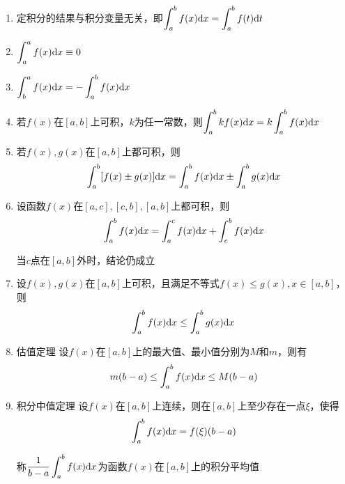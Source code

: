 \begin{property} \label{property:definite_integral}
    \begin{enumerate}
        \item 定积分的结果与积分变量无关，即$\displaystyle\int_a^b f(x)\mathrm{d} x=\int_a^b f(t)\mathrm{d} t$
        \item $\displaystyle\int_a^a f(x)\mathrm{d} x\equiv0$
        \item $\displaystyle\int_b^a f(x)\mathrm{d} x=-\int_a^b f(x)\mathrm{d} x$
        \item 若$f(x)$在$[a,b]$上可积，$k$为任一常数，则$\displaystyle\int_a^b kf(x)\mathrm{d} x=k\int_a^b f(x)\mathrm{d} x$
        \item 若$f(x),g(x)$在$[a,b]$上都可积，则
            \begin{equation}
                \int_a^b [f(x)\pm g(x)]\mathrm{d} x=\int_a^bf(x)\mathrm{d} x\pm\int_a^b g(x)\mathrm{d} x
                \nonumber
            \end{equation}
        \item 设函数$f(x)$在$[a,c],[c,b],[a,b]$上都可积，则
            \begin{equation}
                \int_a^b f(x)\mathrm{d} x=\int_a^c f(x)\mathrm{d} x+\int_c^b f(x)\mathrm{d} x
                \nonumber
            \end{equation}

        当$c$点在$[a,b]$外时，结论仍成立
        \item 设$f(x),g(x)$在$[a,b]$上可积，且满足不等式$f(x)\leq g(x),x\in[a,b]$，则
            \begin{equation}
                \int_a^b f(x)\mathrm{d} x\leq \int_a^b g(x)\mathrm{d} x
                \nonumber
            \end{equation}
        \item 估值定理 \quad 设$f(x)$在$[a,b]$上的最大值、最小值分别为$M$和$m$，则有
            \begin{equation}
                m(b-a)\leq \int_a^b f(x)\mathrm{d} x\leq M(b-a)
                \nonumber
            \end{equation}
        \item 积分中值定理 \quad 设$f(x)$在$[a,b]$上连续，则在$[a,b]$上至少存在一点$\xi$，使得
            \begin{equation}
                \int_a^b f(x)\mathrm{d} x=f(\xi)(b-a)
                \nonumber
            \end{equation}

            称$\displaystyle\dfrac{1}{b-a}\int_a^b f(x)\mathrm{d} x$为函数$f(x)$在$[a,b]$上的积分平均值
    \end{enumerate}
\end{property}
\vspace{2mm}

